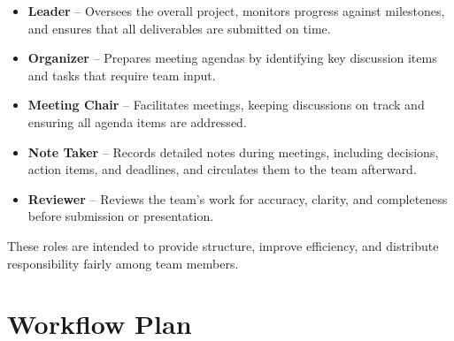 \documentclass{article}
\begin{document}
\begin{itemize}
    \item \textbf{Leader} -- Oversees the overall project, monitors progress against milestones,
    and ensures that all deliverables are submitted on time.

    \item \textbf{Organizer} -- Prepares meeting agendas by identifying key discussion items
    and tasks that require team input.

    \item \textbf{Meeting Chair} -- Facilitates meetings, keeping discussions on track
    and ensuring all agenda items are addressed.

    \item \textbf{Note Taker} -- Records detailed notes during meetings, including decisions,
    action items, and deadlines, and circulates them to the team afterward.

    \item \textbf{Reviewer} -- Reviews the team’s work for accuracy, clarity, and completeness
    before submission or presentation.
\end{itemize}

These roles are intended to provide structure, improve efficiency,
and distribute responsibility fairly among team members.



\section{Workflow Plan}
\end{document}
